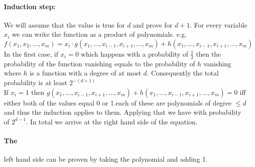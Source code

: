 \documentclass{article}
\begin{document}
\begin{enumerate}
\begin{enumerate}
                \paragraph{Induction step:} We will assume that the value is true for $d$ and prove for $d+1$. For every variable $x_i$ we can write the function as a product of polynomials. e.g.
                \[f(x_1,x_2,\dots,x_m) = x_i\cdot g(x_1,\dots,x_{i-1},x_{i+1},\dots,x_m) +  h(x_1,\dots,x_{i-1},x_{i+1},\dots,x_m)\] In the first case, if $x_i =0$ which happens with a probability of $\frac 12$ then the probability of the function vanishing equals to the probability of $h$ vanishing where $h$ is a function with a degree of at most $d$. Consequently the total probability is at least $2^{-(d+1)}$\\ 
                If $x_i =1$ then $g(x_1,\dots,x_{i-1},x_{i+1},\dots,x_m) +  h(x_1,\dots,x_{i-1},x_{i+1},\dots,x_m)=0$ iff either both of the values equal 0 or 1.each of these are polynomials of degree $\le d$ and thus the induction applies to them. Applying that we have with probability of $2^{d-1}$. In total we arrive at the right hand side of the equation.
                \paragraph{The} left hand side can be proven by taking the polynomial and adding 1.
            \end{enumerate}
    \end{enumerate} 
\end{document}

